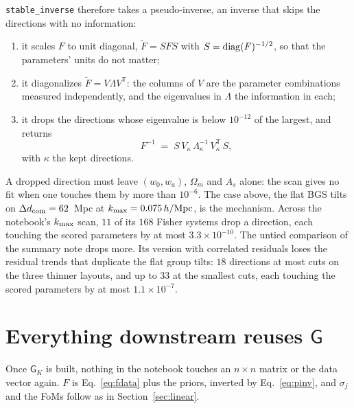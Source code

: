 \documentclass[11pt]{article}
\newcommand{\T}{^{\mathsf{T}}}
\newcommand{\kmax}{k_{\rm max}}
\newcommand{\hMpc}{\,h/{\rm Mpc}}
\newcommand{\mG}{\mathsf{G}}
\newcommand{\us}{\_\allowbreak}
\begin{document}
\texttt{stable\us inverse} therefore takes a pseudo-inverse, an inverse
that skips the directions with no information:
\begin{enumerate}
  \item it scales $F$ to unit diagonal, $\tilde{F} = S F S$ with
    $S = {\rm diag}(F)^{-1/2}$, so that the parameters' units do not
    matter;
  \item it diagonalizes $\tilde{F} = V \Lambda V\T$: the columns of $V$
    are the parameter combinations measured independently, and the
    eigenvalues in $\Lambda$ the information in each;
  \item it drops the directions whose eigenvalue is below $10^{-12}$ of
    the largest, and returns
    \begin{equation}
      F^{-1} \;=\; S\, V_\kappa\, \Lambda_\kappa^{-1}\, V_\kappa\T\, S ,
      \label{eq:pinv}
    \end{equation}
    with $\kappa$ the kept directions.
\end{enumerate}
A dropped direction must leave $(w_0, w_a)$, $\Omega_m$ and $A_s$ alone:
the scan gives no fit when one touches them by more than $10^{-6}$.
The case above, the flat BGS tilts on $\Delta d_{\rm com} = 62$~Mpc at
$\kmax = 0.075\hMpc$, is the mechanism.  Across the notebook's
$\kmax$ scan, $11$ of its $168$ Fisher systems drop a direction, each
touching
the scored parameters by at most $3.3\times10^{-10}$.  The untied
comparison of the summary note
drops more.  Its version with correlated residuals loses the residual
trends that duplicate the flat group tilts: $18$ directions at most cuts
on the three thinner layouts, and up to $33$ at the smallest cuts, each
touching the scored parameters by at most $1.1\times10^{-7}$.

\section{Everything downstream reuses $\mG$}
\label{sec:downstream}

Once $\mG_K$ is built, nothing in the notebook touches an $n \times n$
matrix or the data vector again.  $F$ is Eq.~\eqref{eq:fdata} plus the
priors, inverted by Eq.~\eqref{eq:pinv}, and $\sigma_j$ and the FoMs
follow as in Section~\ref{sec:linear}.
\end{document}
